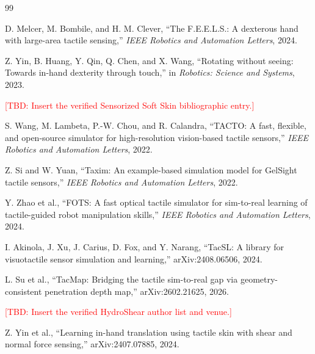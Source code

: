 \documentclass[10pt,twocolumn]{article}
\newcommand{\TBD}[1]{\textcolor{red}{[TBD: #1]}}
\begin{document}

\begin{thebibliography}{99}

D. Melcer, M. Bombile, and H. M. Clever,
``The F.E.E.L.S.: A dexterous hand with large-area tactile sensing,''
\emph{IEEE Robotics and Automation Letters}, 2024.

Z. Yin, B. Huang, Y. Qin, Q. Chen, and X. Wang,
``Rotating without seeing: Towards in-hand dexterity through touch,''
in \emph{Robotics: Science and Systems}, 2023.

\TBD{Insert the verified Sensorized Soft Skin bibliographic entry.}

S. Wang, M. Lambeta, P.-W. Chou, and R. Calandra,
``TACTO: A fast, flexible, and open-source simulator for high-resolution
vision-based tactile sensors,''
\emph{IEEE Robotics and Automation Letters}, 2022.

Z. Si and W. Yuan,
``Taxim: An example-based simulation model for GelSight tactile sensors,''
\emph{IEEE Robotics and Automation Letters}, 2022.

Y. Zhao et al.,
``FOTS: A fast optical tactile simulator for sim-to-real learning of
tactile-guided robot manipulation skills,''
\emph{IEEE Robotics and Automation Letters}, 2024.

I. Akinola, J. Xu, J. Carius, D. Fox, and Y. Narang,
``TacSL: A library for visuotactile sensor simulation and learning,''
arXiv:2408.06506, 2024.

L. Su et al.,
``TacMap: Bridging the tactile sim-to-real gap via geometry-consistent
penetration depth map,''
arXiv:2602.21625, 2026.

\TBD{Insert the verified HydroShear author list and venue.}

Z. Yin et al.,
``Learning in-hand translation using tactile skin with shear and normal force
sensing,''
arXiv:2407.07885, 2024.

\end{thebibliography}
\end{document}
